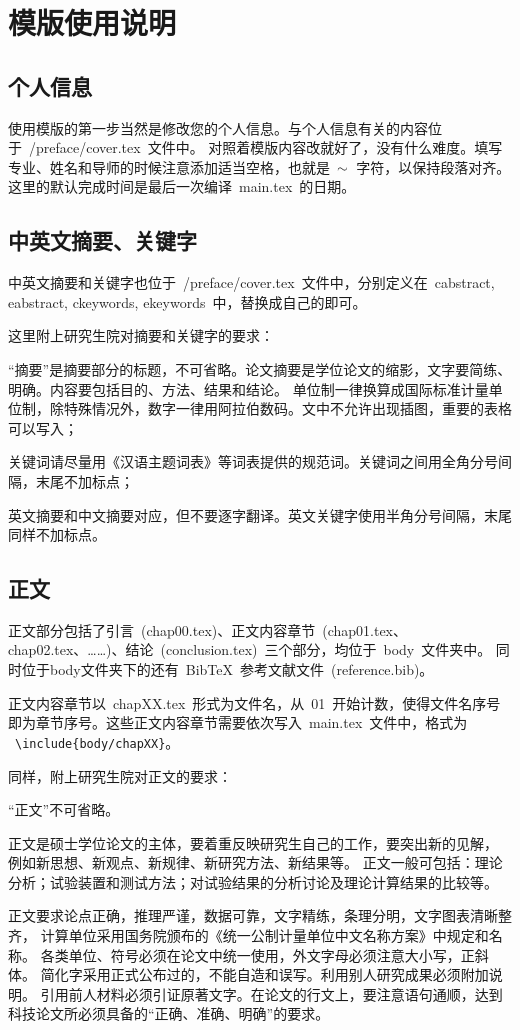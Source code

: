 \chapter{模版使用说明}
\label{chap01}

\section{个人信息}
使用模版的第一步当然是修改您的个人信息。与个人信息有关的内容位于~{/preface/cover.tex}~文件中。
对照着模版内容改就好了，没有什么难度。填写专业、姓名和导师的时候注意添加适当空格，也就是~$\scriptsize{\sim}$~字符，以保持段落对齐。
这里的默认完成时间是最后一次编译~main.tex~的日期。

\section{中英文摘要、关键字}
中英文摘要和关键字也位于~{/preface/cover.tex}~文件中，分别定义在~cabstract, eabstract, ckeywords, ekeywords~中，替换成自己的即可。

这里附上研究生院对摘要和关键字的要求：
\begin{asparaenum}
\item “摘要”是摘要部分的标题，不可省略。论文摘要是学位论文的缩影，文字要简练、明确。内容要包括目的、方法、结果和结论。
    单位制一律换算成国际标准计量单位制，除特殊情况外，数字一律用阿拉伯数码。文中不允许出现插图，重要的表格可以写入；
\item 关键词请尽量用《汉语主题词表》等词表提供的规范词。关键词之间用全角分号间隔，末尾不加标点；
\item 英文摘要和中文摘要对应，但不要逐字翻译。英文关键字使用半角分号间隔，末尾同样不加标点。
\end{asparaenum}

\section{正文}
正文部分包括了引言~(chap00.tex)、正文内容章节~(chap01.tex、chap02.tex、……)、结论~(conclusion.tex)~三个部分，均位于~body~文件夹中。
同时位于body文件夹下的还有~Bib\TeX{}~参考文献文件~(reference.bib)。

正文内容章节以~chapXX.tex~形式为文件名，从~01~开始计数，使得文件名序号即为章节序号。这些正文内容章节需要依次写入~main.tex~文件中，格式为
~\texttt{\footnotesize\textbackslash include\{body/chapXX\}}。

同样，附上研究生院对正文的要求：

“正文”不可省略。

正文是硕士学位论文的主体，要着重反映研究生自己的工作，要突出新的见解，
例如新思想、新观点、新规律、新研究方法、新结果等。
正文一般可包括：理论分析；试验装置和测试方法；对试验结果的分析讨论及理论计算结果的比较等。

正文要求论点正确，推理严谨，数据可靠，文字精练，条理分明，文字图表清晰整齐，
计算单位采用国务院颁布的《统一公制计量单位中文名称方案》中规定和名称。
各类单位、符号必须在论文中统一使用，外文字母必须注意大小写，正斜体。
简化字采用正式公布过的，不能自造和误写。利用别人研究成果必须附加说明。
引用前人材料必须引证原著文字。在论文的行文上，要注意语句通顺，达到科技论文所必须具备的“正确、准确、明确”的要求。 